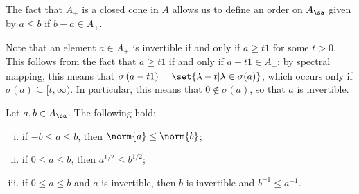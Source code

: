 \documentclass[10pt]{mypackage}
\begin{document}
The fact that $A_{+}$ is a closed cone in $A$ allows us to define an order on $A_{\sa}$ given by $a\leq b$ if $b-a\in A_{+}$.

Note that an element $a\in A_{+}$ is invertible if and only if $a \geq t1$ for some $t > 0$. This follows from the fact that $a \geq t1$ if and only if $a-t1\in A_{+}$; by spectral mapping, this means that $\sigma\left( a-t1 \right) = \set{\lambda - t | \lambda\in \sigma(a)}$, which occurs only if $\sigma(a)\subseteq [t,\infty)$. In particular, this means that $0\notin \sigma(a)$, so that $a$ is invertible.
\begin{proposition}
  Let $a,b\in A_{\sa}$. The following hold:
  \begin{enumerate}[(i)]
    \item if $-b \leq a \leq b$, then $\norm{a}\leq \norm{b}$;
    \item if $0\leq a \leq b$, then $a^{1/2}\leq b^{1/2}$;
    \item if $0\leq a \leq b$ and $a$ is invertible, then $b$ is invertible and $b^{-1}\leq a^{-1}$.
  \end{enumerate}
\end{proposition}
\end{document}
